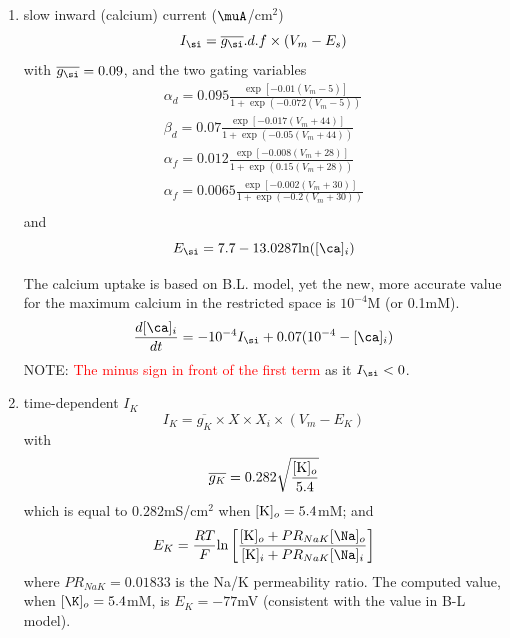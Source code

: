 \begin{enumerate}
\item slow inward (calcium) current ($\muA$/cm$^2$)
  \begin{equation}
    \label{eq:386}
    I_\si = \overline{g_\si} .d .f \times (V_m-E_s)
  \end{equation}
with $\overline{g_\si}=0.09$, and the two gating variables
\begin{equation}
  \label{eq:745}
  \begin{split}
    \alpha_d = 0.095 \frac{\exp[-0.01(V_m-5)]}{1+\exp(-0.072(V_m-5))} \\
    \beta_d = 0.07
    \frac{\exp[-0.017(V_m+44)]}{1+\exp(-0.05(V_m+44))} \\
    \alpha_f =
    0.012\frac{\exp[-0.008(V_m+28)]}{1+\exp(0.15(V_m+28))} \\
    \alpha_f =
    0.0065\frac{\exp[-0.002(V_m+30)]}{1+\exp(-0.2(V_m+30))} \\
  \end{split}
\end{equation}
and
\begin{equation}
  \label{eq:728}
  E_\si = 7.7 - 13.0287\ln([\ca]_i)
\end{equation}

The calcium uptake is based on B.L. model, yet the new, more accurate
value for the maximum calcium in the restricted space is $10^{-4}$M
(or 0.1mM).
\begin{equation}
  \label{eq:740}
  \frac{d[\ca]_i}{dt} = -10^{-4}I_\si + 0.07(10^{-4}-[\ca]_i)
\end{equation}
NOTE:
\textcolor{red}{The minus sign in front of the first term} as it
 $I_\si  < 0$.

\item time-dependent $I_K$
  \begin{equation}
    \label{eq:628}
    I_K = \overline{g_K} \times X \times X_i \times(V_m-E_K)
  \end{equation}
  with
  \begin{equation}
    \label{eq:746}
    \overline{g_K} = 0.282\sqrt{\frac{[\ce{K}]_o}{5.4}}
  \end{equation}
  which is equal to $0.282$mS/cm$^2$ when $[\ce{K}]_o=5.4$mM; and
  \begin{equation}
    \label{eq:747}
    E_{K} = \frac{RT}{F} \ln\left[\frac{[\ce{K}]_o+PR_{NaK}[\Na]_o}{[\ce{K}]_i+PR_{NaK}[\Na]_i}\right]
  \end{equation}
  where $PR_{NaK}=0.01833$ is the Na/K permeability ratio. The
  computed value, when $[\K]_o=5.4$mM, is $E_K=-77$mV (consistent with
  the value in B-L model).


\end{enumerate}
